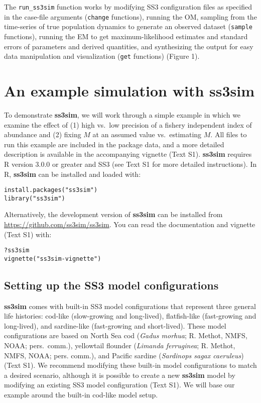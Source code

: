\documentclass[10pt]{article}
\newcommand{\R}[1]{\label{#1}\linelabel{#1}}
\begin{document}
The \texttt{run\_ss3sim} function works by modifying SS3 configuration files as
specified in the case-file arguments (\texttt{change} functions), running the
OM, sampling from the time-series of true population dynamics to generate an
observed dataset (\texttt{sample} functions), running the EM to get
maximum-likelihood estimates and standard errors of parameters and
\R{B19}derived quantities, and synthesizing the output for easy data
manipulation and visualization (\texttt{get} functions) (Figure 1).

\section*{An example simulation with ss3sim}

To demonstrate \textbf{ss3sim}, we will work through a simple example in which
we examine the effect of (1) high vs.~low precision of a fishery independent
index of abundance and (2) \R{B20}fixing $M$ at an assumed value vs.~estimating
$M$. All files to run this example are included in the package data, and a more
detailed description is available in the accompanying vignette (Text S1).
\textbf{ss3sim} requires \textsf{R} version 3.0.0 or greater and SS3 (see Text
S1 for more detailed instructions). In \textsf{R}, \textbf{ss3sim} can be
installed and loaded with:

\begin{verbatim}
install.packages("ss3sim")
library("ss3sim")
\end{verbatim}

\noindent
Alternatively, the development version of \textbf{ss3sim} can be installed from
\url{https://github.com/ss3sim/ss3sim}. You can read the documentation and
vignette (Text S1) with:

\begin{verbatim}
?ss3sim
vignette("ss3sim-vignette")
\end{verbatim}

\subsection*{Setting up the SS3 model configurations}

\textbf{ss3sim} comes with built-in SS3 model configurations that represent
three general life histories: cod-like (slow-growing and long-lived),
flatfish-like (fast-growing and long-lived), and sardine-like (fast-growing and
short-lived). These model configurations are based on North Sea cod
(\emph{Gadus morhua}; R. Methot, NMFS, NOAA; pers.~comm.), yellowtail flounder
(\emph{Limanda ferruginea}; R. Methot, NMFS, NOAA; pers. comm.), and Pacific
sardine (\emph{Sardinops sagax caeruleus}) \cite{hill2012} (Text S1). We
recommend modifying these built-in model configurations to match a desired
scenario, although it is possible to create a new \textbf{ss3sim} model by
modifying an existing SS3 model configuration (Text S1). We will base our
example around the built-in cod-like model setup.
\end{document}
